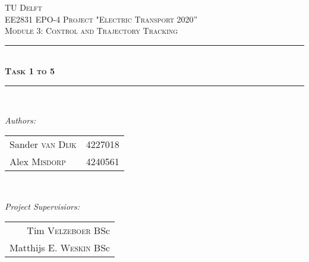 \documentclass[12pt]{scrreprt}
\begin{document}
\begin{titlepage}

\newcommand{\HRule}{\rule{\linewidth}{0.5mm}} %

\center %
 

\textsc{\LARGE TU Delft}\\[1.5cm] %
\textsc{\Large EE2831 EPO-4 Project "Electric Transport 2020''}\\[0.5cm] %
\textsc{\large Module 3: Control and Trajectory Tracking}\\[0.5cm] %


\HRule \\[0.4cm]
\textsc{\huge \bfseries Task 1 to 5}\\[0.2cm] %
\HRule \\[1.5cm]
 

\begin{minipage}{0.45\textwidth}
\begin{flushleft} \large
\emph{Authors:}\\
\begin{tabular}{ll}
Sander \textsc{van Dijk} & 4227018\\
Alex \textsc{Misdorp} & 4240561\\
\end{tabular}

\end{flushleft}
\end{minipage}
~
\begin{minipage}{0.45\textwidth}
\begin{flushright} \large
\emph{Project Supervisiors:} \\
\begin{tabular}{r}
Tim \textsc{Velzeboer} BSc\\
Matthijs E. \textsc{Weskin} BSc\\
\end{tabular}
\end{flushright}
\end{minipage}\\[1.5cm]


\end{titlepage}
\end{document}
